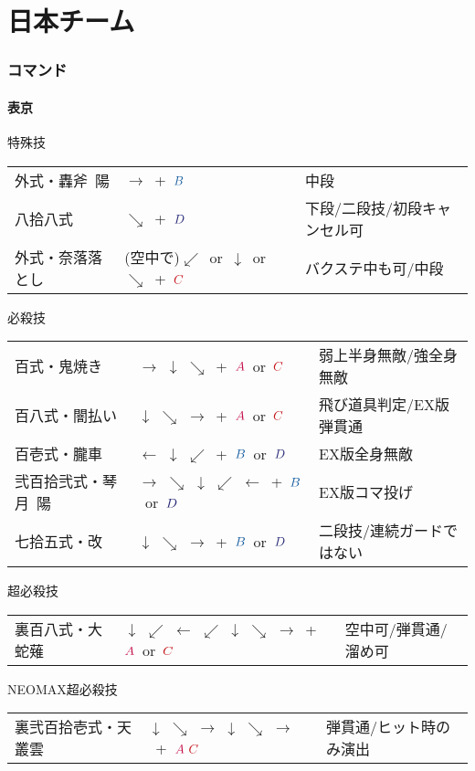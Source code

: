 \documentclass[a4j,11pt]{jarticle}
\def\A{\textcolor{Acolor}{A}}
\def\C{\textcolor{Ccolor}{C}}
\def\B{\textcolor{Bcolor}{B}}
\def\D{\textcolor{Dcolor}{D}}
\begin{document}
\newpage
\part{日本チーム}
\section{コマンド}
\subsection{表京}
\begin{itembox}[l]{特殊技}
\begin{tabular}{lll}
外式・轟斧\ 陽&$\rightarrow$\ +\ $\B$&中段\\
八拾八式&$\searrow$\ +\ $\D$&下段/二段技/初段キャンセル可\\
外式・奈落落とし&(空中で)$\swarrow$\ or\ $\downarrow$\ or\ $\searrow$\ +\ $\C$&バクステ中も可/中段
\end{tabular}
\end{itembox}
\begin{itembox}[l]{必殺技}
\begin{tabular}{lll}
百式・鬼焼き&$\rightarrow$ $\downarrow$ $\searrow$\ +\ $\A$\ or\ $\C$&弱上半身無敵/強全身無敵\\
百八式・闇払い&$\downarrow$ $\searrow$ $\rightarrow$\ +\ $\A$\ or\ $\C$&飛び道具判定/EX版弾貫通\\ 
百壱式・朧車&$\leftarrow$ $\downarrow$ $\swarrow$\ +\ $\B$\ or\ $\D$&EX版全身無敵\\
弐百拾弐式・琴月\ 陽&$\rightarrow$ $\searrow$ $\downarrow$ $\swarrow$ $\leftarrow$\ +\ $\B$\ or\ $\D$&EX版コマ投げ\\
七拾五式・改&$\downarrow$ $\searrow$ $\rightarrow$\ +\ $\B$\ or\ $\D$&二段技/連続ガードではない
\end{tabular}
\end{itembox}
\begin{itembox}[l]{超必殺技}
\begin{tabular}{lll}
裏百八式・大蛇薙&$\downarrow$ $\swarrow$ $\leftarrow$ $\swarrow$ $\downarrow$ $\searrow$ $\rightarrow$\ +\ $\A$\ or\ $\C$& 空中可/弾貫通/溜め可
\end{tabular}
\end{itembox}
\begin{itembox}[l]{NEOMAX超必殺技}
\begin{tabular}{lll}
裏弐百拾壱式・天叢雲&$\downarrow$ $\searrow$ $\rightarrow$ $\downarrow$ $\searrow$ $\rightarrow$\ +\ $\A\ \C$&弾貫通/ヒット時のみ演出
\end{tabular}
\end{itembox}
\newpage
\end{document}
